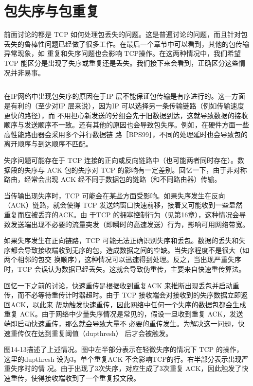 \section{包失序与包重复}
前面讨论的都是 TCP 如何处理包丢失的问题。这是普遍讨论的问题，而且针对包丢失的鲁棒性问题已经做了很多工作。在最后一个章节中可以看到，其他的包传输异常现象，如
重复和失序问题也会影响 TCP操作。在这两种情况中，我们希望 TCP 能区分是出现了失序或重复还是丢失。我们接下来会看到，正确区分这些情况并非易事。


\subsection{}
在IP网络中出现包失序的原因在于IP 层不能保证包传输是有序进行的。这一方面是有利的（至少对IP 层来说），因为IP 可以选择另一条传输链路（例如传输速度更快的路径），而
不用担心新发送的分组会先于旧数据到达，这就导致数据的接收顺序与发送顺序不一致。还有其他的原因也会导致包失序。例如，在硬件方面一些高性能路由器会采用多个并行数据链
路［BPS99］，不同的处理延时也会导致包的离开顺序与到达顺序不匹配。

失序问题可能存在于 TCP 连接的正向或反向链路中（也可能两者同时存在）。数据段的失序与 ACK 包的失序对 TCP 的影响有一定差别。回忆一下，由于非对称路由，经常会出现
ACK 经不同于数据包的链路（和不同路由器）传输。

当传输出现失序时，TCP 可能会在某些方面受影响。如果失序发生在反向（ACK）链路，就会使得 TCP 发送端窗口快速前移，接着又可能收到一些显然重复而应被丢弃的ACK。由
于TCP 的拥塞控制行为（见第16章），这种情况会导致发送端出现不必要的流量突发（即瞬时的高速发送）行为，影响可用网络带宽。

如果失序发生在正向链路，TCP 可能无法正确识别失序和丢包。数据的丢失和失序都会导致接收端收到无序的包，造成数据之间的空缺。当失序程度不是很大（如两个相邻的包交
换顺序），这种情况可以迅速得到处理。反之，当出现严重失序时，TCP 会误认为数据已经丢失。这就会导致伪重传，主要来自快速重传算法。

回忆一下之前的讨论，快速重传是根据收到重复ACK 来推断出现丢包并启动重传，而不必等待重传计时器超时。由于 TCP 接收端会对接收到的失序数据立即返回ACK，以此来
帮助触发快速重传，因此网络中任何一个失序的数据包都会生成重复 ACK。由于网络中少量失序情况是常见的，假设一旦收到重复 ACK，发送端即启动快速重传，那么就会导致大量不
必要的重传发生。为解决这一问题，快速重传仅在达到重复阈值（dupthresh） 后才会被触发。

图14-13描述了上述情况。图中左半部分表示在轻微失序的情况下 TCP 的操作，这里的dupthresh 设为3。单个重复ACK 不会影响TCP的行。右半部分表示出现严重失序时的情
况。由于出现了3次失序，对应生成了3次重复 ACK，因此触发了快速重传，使得接收端收到了一个重复报文段。


